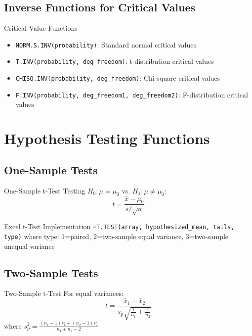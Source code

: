 \documentclass[12pt,a4paper]{book}
\begin{document}
{\subsection{Inverse Functions for Critical Values}

\begin{example}{Critical Value Functions}
\begin{itemize}
    \item \texttt{NORM.S.INV(probability)}: Standard normal critical values
    \item \texttt{T.INV(probability, deg\_freedom)}: t-distribution critical values
    \item \texttt{CHISQ.INV(probability, deg\_freedom)}: Chi-square critical values
    \item \texttt{F.INV(probability, deg\_freedom1, deg\_freedom2)}: F-distribution critical values
\end{itemize}
\end{example}

\section{Hypothesis Testing Functions}

\subsection{One-Sample Tests}

\begin{definition}{One-Sample t-Test}
Testing $H_0: \mu = \mu_0$ vs. $H_1: \mu \neq \mu_0$:
\[
t = \frac{\bar{x} - \mu_0}{s/\sqrt{n}}
\]
\end{definition}

\begin{example}{Excel t-Test Implementation}
\texttt{=T.TEST(array, hypothesized\_mean, tails, type)}
where type: 1=paired, 2=two-sample equal variance, 3=two-sample unequal variance
\end{example}

\subsection{Two-Sample Tests}

\begin{definition}{Two-Sample t-Test}
For equal variances:
\[
t = \frac{\bar{x}_1 - \bar{x}_2}{s_p\sqrt{\frac{1}{n_1} + \frac{1}{n_2}}}
\]
where $s_p^2 = \frac{(n_1-1)s_1^2 + (n_2-1)s_2^2}{n_1 + n_2 - 2}$
\end{definition}

}
\end{document}
